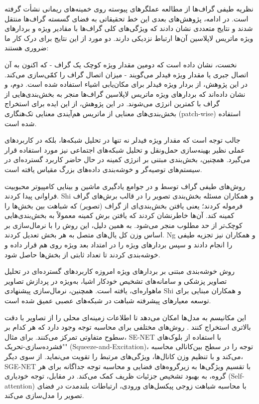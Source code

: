 

نظریه طیفی گراف‌ها از مطالعه عملگرهای پیوسته روی خمینه‌های ریمانی \cite{Cheeger} نشأت گرفته است. در ادامه، پژوهش‌های بعدی این خط تحقیقاتی به فضای گسسته گراف‌ها منتقل شدند و نتایج متعددی نشان دادند که ویژگی‌های کلی گراف‌ها با مقادیر ویژه و بردارهای ویژه ماتریس لاپلاسین آن‌ها ارتباط نزدیکی دارند. دو مورد از این نتایج برای درک کار ما ضروری هستند:

نخست، \cite{Fiedler1973} نشان داده است که دومین مقدار ویژه کوچک یک گراف - که اکنون به آن اتصال جبری یا مقدار ویژه فیدلر می‌گویند - میزان اتصال گراف را کمّی‌سازی می‌کند. در این پژوهش، از بردار ویژه فیدلر برای مکان‌یابی اشیاء استفاده شده است. دوم، \cite{Donath1973LowerBF} و \cite{Fiedler1973} نشان داده‌اند که بردارهای ویژه ماتریس لاپلاسین گراف‌ها منجر به بخش‌بندی‌هایی از گراف با کمترین انرژی می‌شوند. در این پژوهش، از این ایده برای استخراج بخش‌بندی‌های معنایی از ماتریس هم‌آیندی معنایی تک‌هنگاری (patch-wise) استفاده شده است.


جالب توجه است که مقدار ویژه فیدلر نه تنها در تحلیل شبکه‌ها، بلکه در کاربردهای عملی نظیر بهینه‌سازی حمل‌ونقل و تحلیل شبکه‌های اجتماعی نیز مورد استفاده قرار می‌گیرد. همچنین، بخش‌بندی مبتنی بر انرژی کمینه در حال حاضر کاربرد گسترده‌ای در سیستم‌های توصیه‌گر و خوشه‌بندی داده‌های بزرگ مقیاس یافته است.

روش‌های طیفی گراف توسط \cite{NIPS2001_801272ee} و \cite{868688} در جوامع یادگیری ماشین و بینایی کامپیوتر محبوبیت فراوانی پیدا کردند. Shi و همکاران \cite{868688} مسئله بخش‌بندی تصویر را در قالب برش‌های گراف فرموله کردند؛ یعنی یافتن بخش‌بندی‌ای از گراف (تصویر) که شباهت بین بخش‌ها را کمینه کند. آن‌ها خاطرنشان کردند که یافتن برش کمینه معمولاً به بخش‌بندی‌هایی کوچک‌تر از حد مطلوب منجر می‌شود. به همین دلیل، این روش را با نرمال‌سازی بر اساس وزن کل یال‌های متصل به هر بخش تعدیل کردند. Ng و همکاران \cite{NIPS2001_801272ee} نیز تجزیه طیفی را انجام دادند و سپس بردارهای ویژه را در امتداد بعد ویژه روی هم قرار داده و خوشه‌بندی کردند تا تعداد ثابتی از بخش‌ها حاصل شود.


روش خوشه‌بندی مبتنی بر بردارهای ویژه امروزه کاربردهای گسترده‌ای در تحلیل تصاویر پزشکی و سامانه‌های تشخیص خودکار اشیا، به‌ویژه در پردازش تصاویر ماهواره‌ای، یافته است. همچنین، نرمال‌سازی پیشنهادی Shi و همکاران مبنایی برای توسعه معیارهای پیشرفته شباهت در شبکه‌های عصبی عمیق شده است.



این مکانیسم به مدل‌ها امکان می‌دهد تا اطلاعات زمینه‌ای محلی را از تصاویر با دقت بالاتری استخراج کنند \cite{vaswani2023attentionneed}. روش‌های مختلفی برای محاسبه توجه وجود دارد که هر کدام بر سطوح متفاوتی تمرکز می‌کنند. برای مثال، SE-NET \cite{8578843} با استفاده از بلوک‌های "فشرده‌سازی-تحریک" (Squeeze-and-Excitation)، توجه را در سطح بین‌کانالی محاسبه می‌کند و با تنظیم وزن کانال‌ها، ویژگی‌های مرتبط را تقویت می‌نماید. از سوی دیگر، SGE-NET \cite{li2019spatialgroupwiseenhanceimproving} با تقسیم ویژگی‌ها به زیرگروه‌های فضایی و محاسبه توجه جداگانه برای هر گروه، به بهبود تشخیص جزئیات ظریف کمک می‌کند. در مقابل، توجه خودیاری (Self-attention) \cite{Self_Attention} با محاسبه شباهت زوجی پیکسل‌های ورودی، ارتباطات بلندمدت در فضای تصویر را مدل‌سازی می‌کند.


